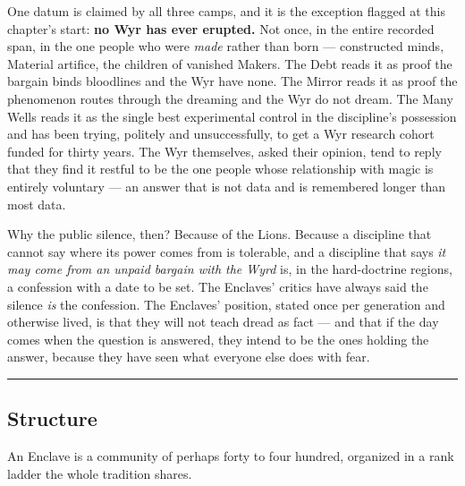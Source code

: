One datum is claimed by all three camps, and it is the exception flagged at this chapter's start: \textbf{no Wyr has ever erupted.} Not once, in the entire recorded span, in the one people who were \textit{made} rather than born --- constructed minds, Material artifice, the children of vanished Makers. The Debt reads it as proof the bargain binds bloodlines and the Wyr have none. The Mirror reads it as proof the phenomenon routes through the dreaming and the Wyr do not dream. The Many Wells reads it as the single best experimental control in the discipline's possession and has been trying, politely and unsuccessfully, to get a Wyr research cohort funded for thirty years. The Wyr themselves, asked their opinion, tend to reply that they find it restful to be the one people whose relationship with magic is entirely voluntary --- an answer that is not data and is remembered longer than most data.

Why the public silence, then? Because of the Lions. Because a discipline that cannot say where its power comes from is tolerable, and a discipline that says \textit{it may come from an unpaid bargain with the Wyrd} is, in the hard-doctrine regions, a confession with a date to be set. The Enclaves' critics have always said the silence \textit{is} the confession. The Enclaves' position, stated once per generation and otherwise lived, is that they will not teach dread as fact --- and that if the day comes when the question is answered, they intend to be the ones holding the answer, because they have seen what everyone else does with fear.

\medskip\hrule\medskip

\subsection{Structure}

An Enclave is a community of perhaps forty to four hundred, organized in a rank ladder the whole tradition shares.

